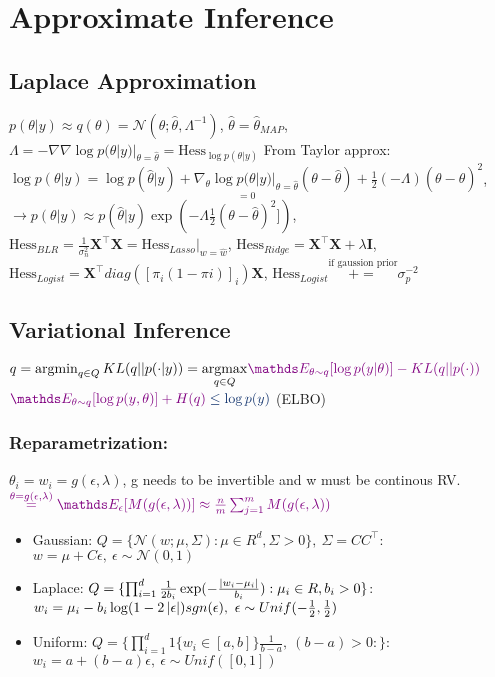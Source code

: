 \section{Approximate Inference}

\subsection{Laplace Approximation}
$p(\theta|y) \approx q(\theta) = \mathcal{N}(\theta; \hat{\theta}, \Lambda^{-1})$, 
$\hat{\theta}=\hat{\theta}_{MAP}$, 
$\Lambda = -\nabla\nabla \log p(\theta|y)|_{\theta=\hat{\theta}} = \text{Hess}_{\log p(\theta|y)}$
From Taylor approx: $\log p(\theta|y) = \log p(\hat{\theta}|y) +
\underset{=0}{\nabla_{\theta} \log p(\theta|y)|_{\theta=\hat{\theta}}}(\theta - \hat{\theta}) +
\frac{1}{2} (-\Lambda) (\theta - \hat{\theta})^{2}$, 
$\rightarrow p(\theta|y) \approx p(\hat{\theta}|y) \exp(- \Lambda \frac{1}{2} (\theta - \hat{\theta})^{2}])$,
$\text{Hess}_{BLR} = \frac{1}{\sigma_{n}^{2}}\bm{X}^{\top}\bm{X} = \text{Hess}_{Lasso}|_{w=\hat{w}}$,
$\text{Hess}_{Ridge} = \bm{X}^{\top}\bm{X} + \lambda\bm{I}$,
$\text{Hess}_{Logist} = \bm{X}^{\top}diag([\pi_{i}(1-\pi{i})]_{i})\bm{X}$,
$\text{Hess}_{Logist} \overset{\text{if gaussion prior}}{+=} \sigma_{p}^{-2}$

\subsection{Variational Inference}
$q=\argmin_{q \in Q}KL(q||p(\cdot|y))=\underset{q\in Q}\argmax \color{violet}\E[\theta \sim q]{\log p(y|\theta)} - KL(q||p(\cdot)) \\$
$\color{violet} \E[\theta \sim q]{\log p(y,\theta)} + H(q) \color{myblue} \leq \log p(y)$ \color{violet}(ELBO)\\
\color{black}
\subsubsection{Reparametrization:}
$\theta_{i}=w_{i}= g(\epsilon, \lambda)$, g needs to be invertible and w must be continous RV.\\
$\color{violet} \overset{\theta= g(\epsilon, \lambda)}{=} \E[\epsilon]{M(g(\epsilon, \lambda))} \approx \frac{n}{m} \sum_{j=1}^{m}M(g(\epsilon, \lambda))$

\begin{itemize}
    \item
    Gaussian: $Q=\{\mathcal{N}(w; \mu, \Sigma): \mu \in R^{d}, \Sigma > 0\},\ \Sigma=CC^{\top}$:
    $w=\mu +C \epsilon,\ \epsilon \sim \mathcal{N}(0,1)$
    \item
    Laplace: $Q=\{ \prod_{i=1}^{d} \frac{1}{2b_{i}} \exp(- \frac{\left\lvert w_{i}- \mu_{i}\right\rvert}{b_{i}}): \mu_{i} \in R, b_{i}>0\}$:
    $w_{i}= \mu_{i}-b_{i}\log(1-2\left\lvert\epsilon\right\rvert)sgn(\epsilon),\ \epsilon \sim Unif(-\frac{1}{2}, \frac{1}{2})$
    \item
    Uniform: $Q=\{\prod_{i=1}^{d} 1\{w_{i} \in \left[ a,b \right] \}\frac{1}{b-a},\ (b-a)>0:\}$:
    $w_{i}= a+(b-a)\epsilon,\ \epsilon \sim Unif(\left[ 0,1 \right] )$
\end{itemize}

